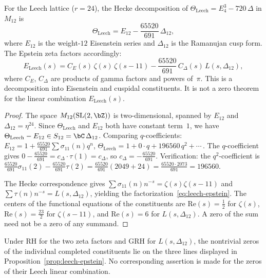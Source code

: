 \begin{proposition}
\label{prop:leech-epstein}
\ClaimStatusProvedHere
For the Leech lattice ($r=24$), the Hecke decomposition of
$\Theta_{\mathrm{Leech}} = E_4^3 - 720\,\Delta$ in $M_{12}$
is
\begin{equation}\label{eq:leech-hecke}
 \Theta_{\mathrm{Leech}}
 = E_{12} - \frac{65520}{691}\,\Delta_{12},
\end{equation}
where $E_{12}$ is the weight-$12$ Eisenstein series and $\Delta_{12}$
is the Ramanujan cusp form. The Epstein zeta factors accordingly:
\begin{equation}\label{eq:leech-epstein}
 E_{\mathrm{Leech}}(s)
 = C_E(s)\,\zeta(s)\,\zeta(s-11)
 - \frac{65520}{691}\,C_\Delta(s)\,L(s,\Delta_{12}),
\end{equation}
where $C_E$, $C_\Delta$ are products of gamma factors and powers
of~$\pi$. This is a decomposition into Eisenstein and cuspidal
constituents. It is not a zero theorem for the linear combination
$E_{\mathrm{Leech}}(s)$.
\end{proposition}

\begin{proof}
The space $M_{12}(\mathrm{SL}(2,\bZ))$ is two-dimensional, spanned by
$E_{12}$ and $\Delta_{12}=\eta^{24}$. Since
$\Theta_{\mathrm{Leech}}$ and $E_{12}$ both have constant term~$1$,
we have $\Theta_{\mathrm{Leech}} - E_{12} \in S_{12} = \bC\,\Delta_{12}$.
Comparing $q$-coefficients:
$E_{12} = 1 + \tfrac{65520}{691}\sum\sigma_{11}(n)q^n$,
$\Theta_{\mathrm{Leech}} = 1 + 0\cdot q + 196560\,q^2 + \cdots$\,.
The $q$-coefficient gives
$0 - \tfrac{65520}{691} = c_\Delta\cdot\tau(1) = c_\Delta$,
so $c_\Delta = -\tfrac{65520}{691}$.
Verification: the $q^2$-coefficient is
$\tfrac{65520}{691}\sigma_{11}(2) - \tfrac{65520}{691}\tau(2)
= \tfrac{65520}{691}(2049+24)
= \tfrac{65520\cdot 2073}{691}
= 196560$. \checkmark

The Hecke correspondence gives
$\sum\sigma_{11}(n)n^{-s}=\zeta(s)\zeta(s{-}11)$ and
$\sum\tau(n)n^{-s}=L(s,\Delta_{12})$, yielding the
factorization~\eqref{eq:leech-epstein}. The centers of the functional
equations of the constituents are
$\mathrm{Re}(s)=\tfrac12$ for $\zeta(s)$,
$\mathrm{Re}(s)=\tfrac{23}{2}$ for $\zeta(s{-}11)$, and
$\mathrm{Re}(s)=6$ for $L(s,\Delta_{12})$. A zero of the sum need not
be a zero of any summand.
\end{proof}

\begin{remark}
\ClaimStatusProvedHere
Under RH for the two zeta factors and GRH for
$L(s,\Delta_{12})$, the nontrivial zeros of the individual completed
constituents lie on the three lines displayed in
Proposition~\ref{prop:leech-epstein}. No corresponding assertion is
made for the zeros of their Leech linear combination.
\end{remark}


